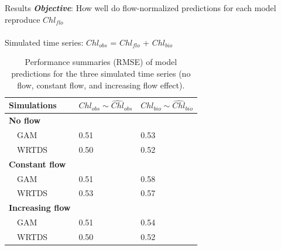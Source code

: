 \documentclass[serif]{beamer}\usepackage[]{graphicx}\usepackage[]{color}
\newcommand{\Bigtxt}[1]{\textbf{\textit{#1}}}
\begin{document}
\begin{frame}{Results}
\Bigtxt{Objective}: How well do flow-normalized predictions for each model reproduce $Chl_{flo}$ \\~\\
Simulated time series: $Chl_{obs}$ = $Chl_{flo}$ + $Chl_{bio}$
\scriptsize
\begin{table}[!tbp]
\caption{Performance summaries (RMSE) of model predictions for the three simulated time series (no flow, constant flow, and increasing flow effect).\label{tab:simperf}} 
\begin{center}
\begin{tabular}{lll}
\hline\hline
\multicolumn{1}{l}{Simulations}&\multicolumn{1}{c}{$Chl_{obs} \sim \widehat{Chl}_{obs}$}&\multicolumn{1}{c}{$Chl_{bio} \sim \widehat{Chl}_{bio}$}\tabularnewline
\hline
{\bfseries No flow}&&\tabularnewline
~~GAM&0.51&0.53\tabularnewline
~~WRTDS&0.50&0.52\tabularnewline
\hline
{\bfseries Constant flow}&&\tabularnewline
~~GAM&0.51&0.58\tabularnewline
~~WRTDS&0.53&0.57\tabularnewline
\hline
{\bfseries Increasing flow}&&\tabularnewline
~~GAM&0.51&0.54\tabularnewline
~~WRTDS&0.50&0.52\tabularnewline
\hline
\end{tabular}\end{center}

\end{table}

\end{frame}
\end{document}
